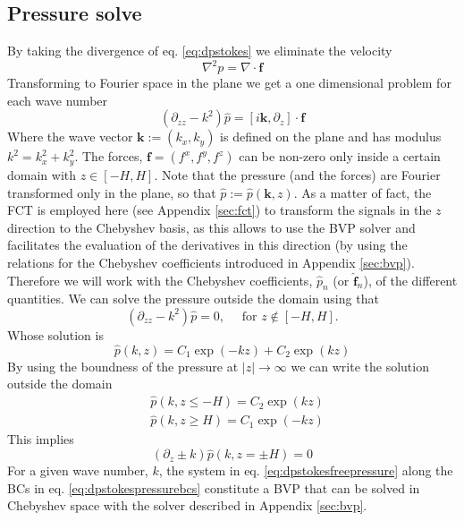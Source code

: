 \documentclass[ twoside,openright,titlepage,numbers=noenddot,%
headinclude,footinclude,cleardoublepage=empty,abstract=on,
BCOR=5mm,paper=a4,fontsize=11pt, dvipsnames
]{scrreprt}
\renewcommand{\vec}[1]{\bm{#1}}
\newcommand{\fou}[1]{\widehat{#1}}
\begin{document}
\subsection*{Pressure solve}
By taking the divergence of eq. \eqref{eq:dpstokes} we eliminate the velocity
\begin{equation}
  \label{eq:dpstokespressure}
  \nabla^2 p = \nabla\cdot\vec{f}
\end{equation}
Transforming to Fourier space in the plane we get a one dimensional problem for each wave number
\begin{equation}
  \label{eq:dpstokesfreepressure}
  (\partial_{zz}-k^2)\fou{p} =
  \left[
    i\vec{k},
    \partial_z\right]
  \cdot\vec{f}
\end{equation}
Where the wave vector $\vec{k}:=(k_x, k_y)$ is defined on the plane and has modulus $k^2 = k_x^2 + k_y^2$. The forces, $\vec{f}=(f^x, f^y, f^z)$ can be non-zero only inside a certain domain with $z\in [-H,H]$. Note that the pressure (and the forces) are Fourier transformed only in the plane, so that $\fou{p} :=\fou{p}(\vec{k}, z)$. As a matter of fact, the \gls{FCT} is employed here (see Appendix \ref{sec:fct}) to transform the signals in the $z$ direction to the Chebyshev basis, as this allows to use the \gls{BVP} solver and facilitates the evaluation of the derivatives in this direction (by using the relations for the Chebyshev coefficients introduced in Appendix \ref{sec:bvp}). Therefore we will work with the Chebyshev coefficients, $\fou{p}_n$ (or $\fou{\vec{f}}_n$), of the different quantities. We can solve the pressure outside the domain using that
\begin{equation}
    (\partial_{zz}-k^2)\fou{p} = 0, \quad \text{ for } z \notin [-H,H].
\end{equation}
Whose solution is
\begin{equation}
  \fou{p}(k, z) = C_1\exp(-kz) + C_2\exp(kz)
\end{equation}
By using the boundness of the pressure at $|z|\rightarrow\infty$ we can write the solution outside the domain
\begin{equation}
  \begin{aligned}
    &\fou{p}(k,z\le -H) = C_2\exp(kz)\\
    &\fou{p}(k,z\ge H) = C_1\exp(-kz)    
  \end{aligned}
\end{equation}
This implies
\begin{equation}
  \label{eq:dpstokespressurebcs}
  (\partial_z\pm k)\fou{p}(k, z=\pm H) = 0
\end{equation}
For a given wave number, $k$, the system in eq. \eqref{eq:dpstokesfreepressure} along the \glspl{BC} in eq. \eqref{eq:dpstokespressurebcs} constitute a \gls{BVP} that can be solved in Chebyshev space with the solver described in Appendix \ref{sec:bvp}.
\end{document}
